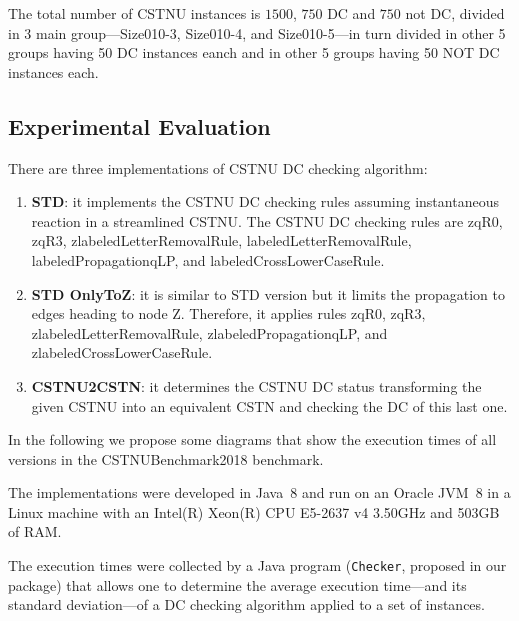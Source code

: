 \documentclass[a4paper,11pt]{article}
\begin{document}
The total number of CSTNU instances is $1500$, $750$ DC and $750$ not DC, divided in 3 main group---Size010-3, Size010-4, and Size010-5---in turn divided in other 5 groups having 50 DC instances eanch and in other 5 groups having 50 NOT DC instances each.

  
\subsection{Experimental Evaluation}

There are three implementations of CSTNU DC checking algorithm:
\begin{enumerate}
	\item \textbf{STD}: it implements the CSTNU DC checking rules assuming instantaneous reaction in a streamlined CSTNU. The CSTNU DC checking rules are zqR0, zqR3, zlabeledLetterRemovalRule,
	labeledLetterRemovalRule, labeledPropagationqLP, and labeledCrossLowerCaseRule. 
	
	\item \textbf{STD OnlyToZ}: it is similar to STD version but it limits the propagation to edges heading to node Z. Therefore, it applies rules zqR0, zqR3, zlabeledLetterRemovalRule,
	zlabeledPropagationqLP, and zlabeledCrossLowerCaseRule. 
	
	\item \textbf{CSTNU2CSTN}: it determines the CSTNU DC status transforming the given CSTNU into an equivalent CSTN and checking the DC of this last one.
\end{enumerate}
In the following we propose some diagrams that show the execution times of all versions in the CSTNUBenchmark2018 benchmark.

The implementations were developed in Java~8 and run on an Oracle JVM~8 in a Linux machine with an Intel(R) Xeon(R) CPU E5-2637 v4 \@ 3.50GHz and 503GB of RAM.

The execution times were collected by a Java program (\texttt{Checker}, proposed in our package) that allows one to determine the average execution time---and its standard deviation---of a DC checking algorithm applied to a set of instances.
\end{document}
